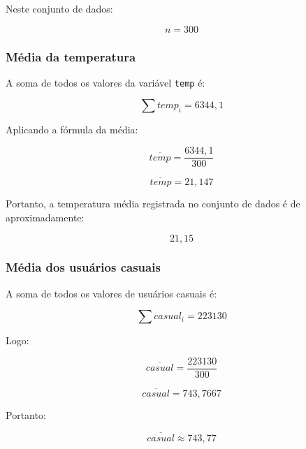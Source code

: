 \documentclass[12pt,a4paper]{article}
\begin{document}
Neste conjunto de dados:

\begin{equation}
n = 300
\end{equation}

\subsubsection*{Média da temperatura}

A soma de todos os valores da variável \texttt{temp} é:

\begin{equation}
\sum temp_i = 6344{,}1
\end{equation}

Aplicando a fórmula da média:

\begin{equation}
\overline{temp} =
\frac{6344{,}1}{300}
\end{equation}

\begin{equation}
\overline{temp} = 21{,}147
\end{equation}

Portanto, a temperatura média registrada no conjunto de dados é de
aproximadamente:

\begin{equation}
\boxed{21{,}15}
\end{equation}

\subsubsection*{Média dos usuários casuais}

A soma de todos os valores de usuários casuais é:

\begin{equation}
\sum casual_i = 223130
\end{equation}

Logo:

\begin{equation}
\overline{casual} =
\frac{223130}{300}
\end{equation}

\begin{equation}
\overline{casual} =
743{,}7667
\end{equation}

Portanto:

\begin{equation}
\boxed{\overline{casual} \approx 743{,}77}
\end{equation}
\end{document}
